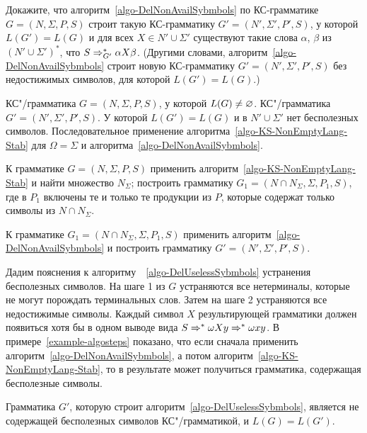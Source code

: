\begin{myproblem}
\label{problem-eqOfLangsWithoutUselessSymbols}
Докажите, что алгоритм~\ref{algo-DelNonAvailSybmbols} по КС-грамматике $G=(N,\Sigma,P,S)$ строит такую КС-грамматику $G'=(N' ,\Sigma',P',S)$, у которой $L(G')=L(G)$ и для всех $X\in N'\cup\Sigma'$ существуют такие слова $\alpha$, $\beta$ из $(N'\cup\Sigma')^*$, что $S\Rightarrow_{G'}^*\alpha X\beta$. (Другими словами, алгоритм~\ref{algo-DelNonAvailSybmbols} строит новую КС-грамматику $G'=(N',\Sigma',P',S)$ без недостижимых символов, для которой $L(G')=L(G)$.)
\end{myproblem}

{\label{algo-DelUselessSybmbols}КС"/грамматика $G=(N,\Sigma,P,S)$, у которой $L(G)\neq\varnothing$.}
{КС"/грамматика $G'=(N',\Sigma',P',S)$. У которой $L(G')=L(G)$ и в $N'\cup\Sigma'$ нет бесполезных символов.}
{Последовательное применение алгоритма~\ref{algo-KS-NonEmptyLang-Stab} для $\Omega=\Sigma$ и алгоритма~\ref{algo-DelNonAvailSybmbols}.}
{
\item К грамматике $G=(N,\Sigma,P,S)$ применить алгоритм~\ref{algo-KS-NonEmptyLang-Stab} и найти множество $N_\Sigma$; построить грамматику $G_1=(N\cap N_\Sigma,\Sigma,P_1,S)$, где в $P_1$ включены те и только те продукции из $P$, которые содержат только символы из $N\cap N_\Sigma$.

\item К грамматике $G_1=(N\cap N_\Sigma,\Sigma,P_1,S)$ применить алгоритм~\ref{algo-DelNonAvailSybmbols} и построить грамматику $G'=(N',\Sigma',P',S)$.
}

Дадим пояснения к алгоритму~~\ref{algo-DelUselessSybmbols} устранения бесполезных символов. На шаге 1 из $G$ устраняются все нетерминалы, которые не могут порождать терминальных слов. Затем на шаге 2 устраняются все недостижимые символы. Каждый символ $X$ результирующей грамматики должен появиться хотя бы в одном выводе вида $S\Rightarrow^*\omega Xy\Rightarrow^*\omega xy$. В примере~\ref{example-algosteps} показано, что если сначала применить алгоритм~\ref{algo-DelNonAvailSybmbols}, а потом алгоритм~\ref{algo-KS-NonEmptyLang-Stab}, то в результате может получиться грамматика, содержащая бесполезные символы.

\begin{mytheorem}
\label{theorem-AlgoDelUselessSymbolsCorrectness}
Грамматика $G'$, которую строит алгоритм~\ref{algo-DelUselessSybmbols}, является не содержащей бесполезных символов КС"/грамматикой, и $L(G)=L(G')$.
\end{mytheorem}


